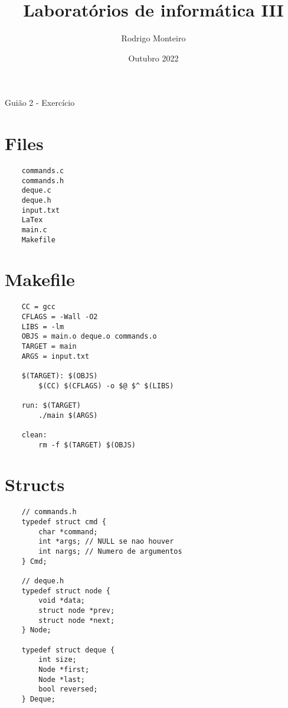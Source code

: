 \documentclass[12pt]{article}
\title{Laboratórios de informática III}
\author{Rodrigo Monteiro}
\date{Outubro 2022}
\begin{document}
\maketitle
\pagebreak

\begin{center}
    {\huge Guião 2 - Exercício} \\[8pt]
\end{center}

\section{Files}

\begin{verbatim}
    commands.c
    commands.h
    deque.c
    deque.h
    input.txt
    LaTex
    main.c
    Makefile
\end{verbatim}

\section{Makefile}

\begin{lstlisting}
    CC = gcc
    CFLAGS = -Wall -O2
    LIBS = -lm
    OBJS = main.o deque.o commands.o
    TARGET = main
    ARGS = input.txt

    $(TARGET): $(OBJS)
    	$(CC) $(CFLAGS) -o $@ $^ $(LIBS)

    run: $(TARGET)
    	./main $(ARGS)

    clean:
    	rm -f $(TARGET) $(OBJS)
\end{lstlisting}

\pagebreak

\section{Structs}

\begin{lstlisting}
    // commands.h
    typedef struct cmd {
        char *command;
        int *args; // NULL se nao houver
        int nargs; // Numero de argumentos
    } Cmd;

    // deque.h
    typedef struct node {
        void *data;
        struct node *prev;
        struct node *next;
    } Node;

    typedef struct deque {
        int size;
        Node *first;
        Node *last;
        bool reversed;
    } Deque;
\end{lstlisting}
\end{document}
